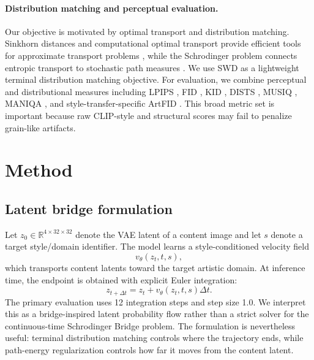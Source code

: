 ﻿\documentclass[letterpaper]{article}
\begin{document}
\paragraph{Distribution matching and perceptual evaluation.}
Our objective is motivated by optimal transport and distribution matching. Sinkhorn distances and computational optimal transport provide efficient tools for approximate transport problems \cite{cuturi2013sinkhorn,peyre2019computational}, while the Schrodinger problem connects entropic transport to stochastic path measures \cite{leonard2014survey}. We use SWD as a lightweight terminal distribution matching objective. For evaluation, we combine perceptual and distributional measures including LPIPS \cite{zhang2018lpips}, FID \cite{heusel2017fid}, KID \cite{binkowski2018kid}, DISTS \cite{ding2020dists}, MUSIQ \cite{ke2021musiq}, MANIQA \cite{yang2022maniqa}, and style-transfer-specific ArtFID \cite{wright2022artfid}. This broad metric set is important because raw CLIP-style and structural scores may fail to penalize grain-like artifacts.

\section{Method}
\subsection{Latent bridge formulation}
Let $z_0 \in \mathbb{R}^{4 \times 32 \times 32}$ denote the VAE latent of a content image and let $s$ denote a target style/domain identifier. The model learns a style-conditioned velocity field
\begin{equation}
    v_\theta(z_t,t,s),
\end{equation}
which transports content latents toward the target artistic domain. At inference time, the endpoint is obtained with explicit Euler integration:
\begin{equation}
    z_{t+\Delta t} = z_t + v_\theta(z_t,t,s)\Delta t .
\end{equation}
The primary evaluation uses 12 integration steps and step size 1.0. We interpret this as a bridge-inspired latent probability flow rather than a strict solver for the continuous-time Schrodinger Bridge problem. The formulation is nevertheless useful: terminal distribution matching controls where the trajectory ends, while path-energy regularization controls how far it moves from the content latent.
\end{document}

